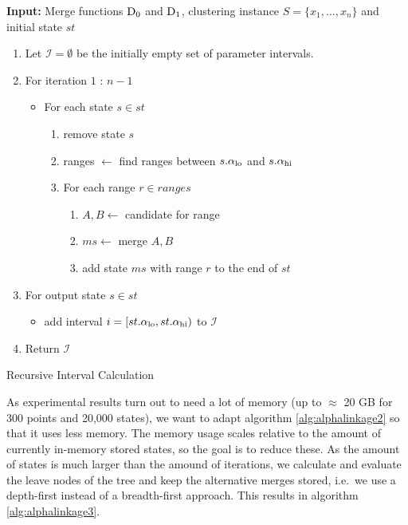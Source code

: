 \begin{algorithm}
    \textbf{Input:} Merge functions $\operatorname{D_{0}}$ and $\operatorname{D_{1}}$, clustering instance $S = \{x_1, \dots, x_n\}$ and initial state $st$
    \begin{enumerate}[nosep, leftmargin=*]
    \item Let $\mathcal{I} = \emptyset$ be the initially empty set of parameter intervals.
    \item For iteration $1$ : $n-1$
    \begin{itemize}[nosep, leftmargin=*]
        \item For each state $s \in st$
        \begin{enumerate}[nosep, leftmargin=*]
            \item remove state $s$
            \item ranges $\gets$ find ranges between $s.\alpha_\text{lo}$ and $s.\alpha_\text{hi}$
            \item For each range $r \in ranges$
            \begin{enumerate}
                \item $A, B \gets$ candidate for range
                \item $ms \gets$ merge $A, B$\;
                \item add state $ms$ with range $r$ to the end of $st$
            \end{enumerate}
        \end{enumerate}
    \end{itemize}
    \item For output state $s \in st$
            \begin{itemize}
                \item add interval $i = [st.\alpha_\text{lo}, st.\alpha_\text{hi})$ to $\mathcal{I}$
            \end{itemize}
        \item Return $\mathcal{I}$
    \end{enumerate}
    \caption{Recursive Interval Calculation}
    \label{alg:alphalinkage2}
\end{algorithm}

As experimental results turn out to need a lot of memory (up to $\approx$ 20 GB for 300 points and 20,000 states), we want to adapt algorithm \ref{alg:alphalinkage2} so that it uses less memory. The memory usage scales relative to the amount of currently in-memory stored states, so the goal is to reduce these. As the amount of states is much larger than the amound of iterations, we calculate and evaluate the leave nodes of the tree and keep the alternative merges stored, i.e.\ we use a depth-first instead of a breadth-first approach. This results in algorithm \ref{alg:alphalinkage3}.

